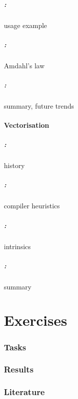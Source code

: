 \documentclass[9pt,xcolor=table]{beamer}
\begin{document}
\begin{frame}
\frametitle{\insertsectionhead{}: \insertsubsectionhead{}}
usage example
\end{frame}

\begin{frame}
\frametitle{\insertsectionhead{}: \insertsubsectionhead{}}
Amdahl's law
\end{frame}

\begin{frame}
\frametitle{\insertsectionhead{}: \insertsubsectionhead{}}
summary, future trends
\end{frame}

\subsection{Vectorisation}
\begin{frame}
\frametitle{\insertsectionhead{}: \insertsubsectionhead{}}
history
\end{frame}

\begin{frame}
\frametitle{\insertsectionhead{}: \insertsubsectionhead{}}
compiler heuristics
\end{frame}

\begin{frame}
\frametitle{\insertsectionhead{}: \insertsubsectionhead{}}
intrinsics
\end{frame}

\begin{frame}
\frametitle{\insertsectionhead{}: \insertsubsectionhead{}}
summary
\end{frame}

\part{Exercises}
\section{Tasks}
\section{Results}

\section{Literature}
\begin{frame}[c]
\frametitle{\insertsection{}}
\nocite{*}
\tiny%


\end{frame}
\end{document}
